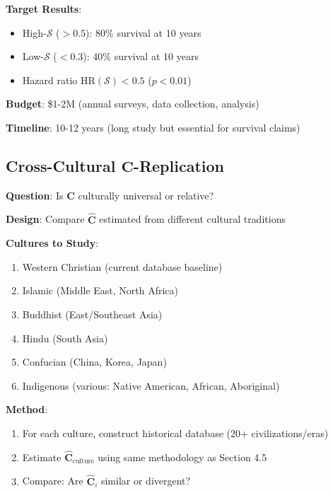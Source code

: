 \documentclass[11pt,a4paper]{article}
\theoremstyle{definition}
\theoremstyle{remark}
\begin{document}
\begin{enumerate}
\begin{protocol}
\textbf{Target Results}:
\begin{itemize}
    \item High-\(\mathcal{S}\) (\(> 0.5\)): 80\% survival at 10 years
    \item Low-\(\mathcal{S}\) (\(< 0.3\)): 40\% survival at 10 years
    \item Hazard ratio \(\text{HR}(\mathcal{S}) < 0.5\) (\(p < 0.01\))
\end{itemize}

\textbf{Budget}: \$1-2M (annual surveys, data collection, analysis)

\textbf{Timeline}: 10-12 years (long study but essential for survival claims)
\end{protocol}

\subsection{Cross-Cultural \(\mathbf{C}\)-Replication}

\begin{protocol}
\textbf{Question}: Is \(\mathbf{C}\) culturally universal or relative?

\textbf{Design}: Compare \(\hat{\mathbf{C}}\) estimated from different cultural traditions

\textbf{Cultures to Study}:
\begin{enumerate}
    \item Western Christian (current database baseline)
    \item Islamic (Middle East, North Africa)
    \item Buddhist (East/Southeast Asia)
    \item Hindu (South Asia)
    \item Confucian (China, Korea, Japan)
    \item Indigenous (various: Native American, African, Aboriginal)
\end{enumerate}

\textbf{Method}:
\begin{enumerate}
    \item For each culture, construct historical database (20+ civilizations/eras)
    \item Estimate \(\hat{\mathbf{C}}_{\text{culture}}\) using same methodology as Section 4.5
    \item Compare: Are \(\hat{\mathbf{C}}_i\) similar or divergent?
\end{enumerate}


\end{protocol}
\end{enumerate}
\end{document}
